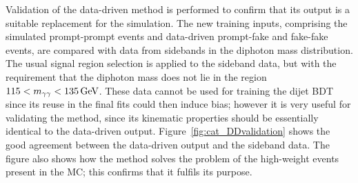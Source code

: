 
Validation of the data-driven method is performed to confirm that its output is 
a suitable replacement for the simulation.
The new training inputs, 
comprising the simulated prompt-prompt events and data-driven prompt-fake and fake-fake events, 
are compared with data from sidebands in the diphoton mass distribution.
The usual signal region selection is applied to the sideband data, 
but with the requirement that the diphoton mass does not lie in the region $115 < m_{\gamma\gamma} < \SI{135}{GeV}$.
These data cannot be used for training the dijet BDT since its reuse in the final fits 
could then induce bias; 
however it is very useful for validating the method, 
since its kinematic properties should be essentially identical to the data-driven output.
Figure~\ref{fig:cat_DDvalidation} shows the good agreement between the data-driven output
and the sideband data. 
The figure also shows how the method solves the problem of the high-weight events present in the MC; 
this confirms that it fulfils its purpose.

